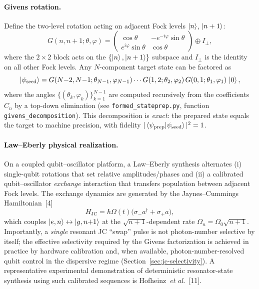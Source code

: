 \documentclass[11pt]{article}
\begin{document}
\paragraph{Givens rotation.}
Define the two-level rotation acting on adjacent Fock levels $\ket{n}$, $\ket{n+1}$:
\begin{equation}
G(n,n{+}1;\theta,\varphi)
=\begin{pmatrix}\cos\theta & -e^{-i\varphi}\sin\theta\\
e^{i\varphi}\sin\theta & \cos\theta\end{pmatrix}
\oplus I_{\perp},
\label{eq:givens-rotation}
\end{equation}
where the $2\times2$ block acts on the $\{\ket{n},\ket{n+1}\}$ subspace
and $I_\perp$ is the identity on all other Fock levels.
Any $N$-component target state can be factored as
\begin{equation}
\ket{\psi_{\mathrm{seed}}}
=G(N{-}2,N{-}1;\theta_{N-1},\varphi_{N-1})\cdots G(1,2;\theta_2,\varphi_2)
\,G(0,1;\theta_1,\varphi_1)\,\ket{0},
\label{eq:givens-decomposition}
\end{equation}
where the angles $\{(\theta_k,\varphi_k)\}_{k=1}^{N-1}$ are computed
recursively from the coefficients $C_n$ by a top-down elimination
(see \texttt{formed\_stateprep.py}, function \texttt{givens\_decomposition}).
This decomposition is \emph{exact}: the prepared state equals the target
to machine precision, with fidelity $|\braket{\psi_{\mathrm{prep}}}{\psi_{\mathrm{seed}}}|^2=1$.

\paragraph{Law--Eberly physical realization.}
On a coupled qubit--oscillator platform, a Law--Eberly synthesis alternates
(i) single-qubit rotations that set relative amplitudes/phases and
(ii) a calibrated qubit--oscillator \emph{exchange} interaction that transfers
population between adjacent Fock levels.
The exchange dynamics are generated by the Jaynes--Cummings Hamiltonian~[4]
\begin{equation}
H_{\mathrm{JC}} = \hbar\Omega(t)\bigl(\sigma_- a^\dagger + \sigma_+ a\bigr),
\label{eq:jc-hamiltonian}
\end{equation}
which couples $\ket{e,n}\leftrightarrow\ket{g,n{+}1}$ at the $\sqrt{n+1}$-dependent rate
$\Omega_{n}=\Omega_0\sqrt{n+1}$.
Importantly, a \emph{single} resonant JC ``swap'' pulse is not photon-number selective by itself; the
effective selectivity required by the Givens factorization is achieved in practice by
hardware calibration and, when available, photon-number-resolved qubit control in the dispersive regime
(Section~\ref{sec:jc-selectivity}).
A representative experimental demonstration of deterministic resonator-state synthesis using such calibrated
sequences is Hofheinz~\emph{et al.}~[11].
\end{document}
